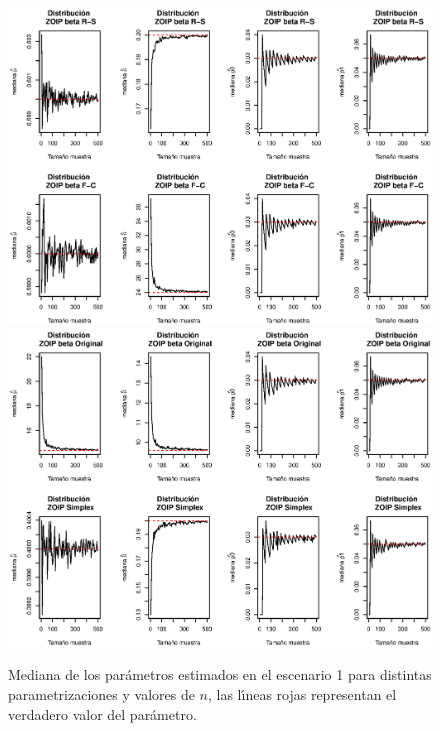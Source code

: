 \begin{figure}
	\begin{center}
		\includegraphics[scale=0.55]{Simulacion_RS_FC.eps}
		\quad
		\includegraphics[scale=0.55]{Simulacion_Ori_Sim.eps}	
		\caption{Mediana de los par\'{a}metros estimados en el escenario 1 para distintas parametrizaciones y valores de $n$, las l\'{\i}neas rojas representan el verdadero valor del par\'{a}metro.}
		\label{Simu_1}
	\end{center}
\end{figure}

